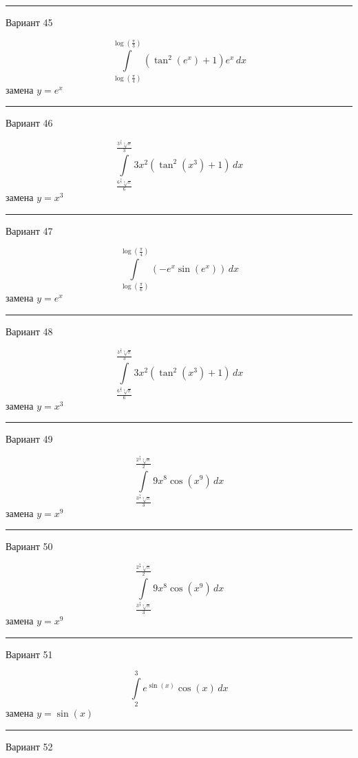 \documentclass[11pt]{report}
\begin{document}
\rule{\textwidth}{.2mm}

Вариант 45

$$\int\limits_{\log{\left(\frac{\pi}{4} \right)}}^{\log{\left(\frac{\pi}{3} \right)}} \left(\tan^{2}{\left(e^{x} \right)} + 1\right) e^{x}\, dx$$
замена $y = e^{x}$



\rule{\textwidth}{.2mm}

Вариант 46

$$\int\limits_{\frac{6^{\frac{2}{3}} \sqrt[3]{\pi}}{6}}^{\frac{3^{\frac{2}{3}} \sqrt[3]{\pi}}{3}} 3 x^{2} \left(\tan^{2}{\left(x^{3} \right)} + 1\right)\, dx$$
замена $y = x^{3}$



\rule{\textwidth}{.2mm}

Вариант 47

$$\int\limits_{\log{\left(\frac{\pi}{6} \right)}}^{\log{\left(\frac{\pi}{4} \right)}} \left(- e^{x} \sin{\left(e^{x} \right)}\right)\, dx$$
замена $y = e^{x}$



\rule{\textwidth}{.2mm}

Вариант 48

$$\int\limits_{\frac{6^{\frac{2}{3}} \sqrt[3]{\pi}}{6}}^{\frac{3^{\frac{2}{3}} \sqrt[3]{\pi}}{3}} 3 x^{2} \left(\tan^{2}{\left(x^{3} \right)} + 1\right)\, dx$$
замена $y = x^{3}$



\rule{\textwidth}{.2mm}

Вариант 49

$$\int\limits_{\frac{3^{\frac{8}{9}} \sqrt[9]{\pi}}{3}}^{\frac{2^{\frac{8}{9}} \sqrt[9]{\pi}}{2}} 9 x^{8} \cos{\left(x^{9} \right)}\, dx$$
замена $y = x^{9}$



\rule{\textwidth}{.2mm}

Вариант 50

$$\int\limits_{\frac{3^{\frac{8}{9}} \sqrt[9]{\pi}}{3}}^{\frac{2^{\frac{8}{9}} \sqrt[9]{\pi}}{2}} 9 x^{8} \cos{\left(x^{9} \right)}\, dx$$
замена $y = x^{9}$



\rule{\textwidth}{.2mm}

Вариант 51

$$\int\limits_{2}^{3} e^{\sin{\left(x \right)}} \cos{\left(x \right)}\, dx$$
замена $y = \sin{\left(x \right)}$



\rule{\textwidth}{.2mm}

Вариант 52
\end{document}
